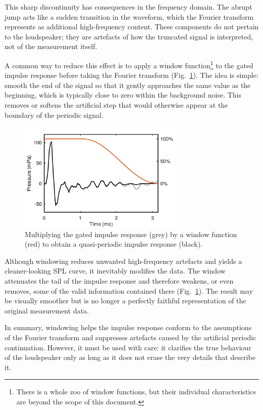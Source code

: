 \documentclass[12pt,a4paper]{article}
\providecommand{\figlabel}[1]{\label{fig:#1}}
\providecommand{\figr}[1]{Fig.~\ref{fig:#1}}
\begin{document}
This sharp discontinuity has consequences in the frequency domain. The abrupt jump acts like a sudden transition in the waveform, which the Fourier transform represents as additional high-frequency content. These components do not pertain to the loudspeaker; they are artefacts of how the truncated signal is interpreted, not of the measurement itself.

A common way to reduce this effect is to apply a window function\footnote{There is a whole zoo of window functions, but their individual characteristics are beyond the scope of this document.} to the gated impulse response before taking the Fourier transform (\figr{FIGURE4}). The idea is simple: smooth the end of the signal so that it gently approaches the same value as the beginning, which is typically close to zero within the background noise. This removes or softens the artificial step that would otherwise appear at the boundary of the periodic signal.

\begin{figure}[tbp]
  \begin{center}
    \includegraphics[width=0.7\textwidth]{FIGURE4}
    \caption{Multiplying the gated impulse response (grey) by a window function (red) to obtain a quasi-periodic impulse response (black).}
    \figlabel{FIGURE4}
  \end{center}
\end{figure}

Although windowing reduces unwanted high-frequency artefacts and yields a cleaner-looking SPL curve, it inevitably modifies the data. The window attenuates the tail of the impulse response and therefore weakens, or even removes, some of the valid information contained there (\figr{FIGURE4}). The result may be visually smoother but is no longer a perfectly faithful representation of the original measurement data.

In summary, windowing helps the impulse response conform to the assumptions of the Fourier transform and suppresses artefacts caused by the artificial periodic continuation. However, it must be used with care: it clarifies the true behaviour of the loudspeaker only as long as it does not erase the very details that describe it.
\end{document}
